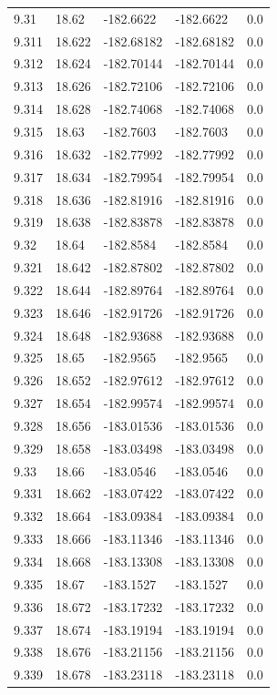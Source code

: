 \begin{tabular}{lllll}
9.31 & 18.62 & -182.6622 & -182.6622 & 0.0 \\
9.311 & 18.622 & -182.68182 & -182.68182 & 0.0 \\
9.312 & 18.624 & -182.70144 & -182.70144 & 0.0 \\
9.313 & 18.626 & -182.72106 & -182.72106 & 0.0 \\
9.314 & 18.628 & -182.74068 & -182.74068 & 0.0 \\
9.315 & 18.63 & -182.7603 & -182.7603 & 0.0 \\
9.316 & 18.632 & -182.77992 & -182.77992 & 0.0 \\
9.317 & 18.634 & -182.79954 & -182.79954 & 0.0 \\
9.318 & 18.636 & -182.81916 & -182.81916 & 0.0 \\
9.319 & 18.638 & -182.83878 & -182.83878 & 0.0 \\
9.32 & 18.64 & -182.8584 & -182.8584 & 0.0 \\
9.321 & 18.642 & -182.87802 & -182.87802 & 0.0 \\
9.322 & 18.644 & -182.89764 & -182.89764 & 0.0 \\
9.323 & 18.646 & -182.91726 & -182.91726 & 0.0 \\
9.324 & 18.648 & -182.93688 & -182.93688 & 0.0 \\
9.325 & 18.65 & -182.9565 & -182.9565 & 0.0 \\
9.326 & 18.652 & -182.97612 & -182.97612 & 0.0 \\
9.327 & 18.654 & -182.99574 & -182.99574 & 0.0 \\
9.328 & 18.656 & -183.01536 & -183.01536 & 0.0 \\
9.329 & 18.658 & -183.03498 & -183.03498 & 0.0 \\
9.33 & 18.66 & -183.0546 & -183.0546 & 0.0 \\
9.331 & 18.662 & -183.07422 & -183.07422 & 0.0 \\
9.332 & 18.664 & -183.09384 & -183.09384 & 0.0 \\
9.333 & 18.666 & -183.11346 & -183.11346 & 0.0 \\
9.334 & 18.668 & -183.13308 & -183.13308 & 0.0 \\
9.335 & 18.67 & -183.1527 & -183.1527 & 0.0 \\
9.336 & 18.672 & -183.17232 & -183.17232 & 0.0 \\
9.337 & 18.674 & -183.19194 & -183.19194 & 0.0 \\
9.338 & 18.676 & -183.21156 & -183.21156 & 0.0 \\
9.339 & 18.678 & -183.23118 & -183.23118 & 0.0 \\

\end{tabular}
